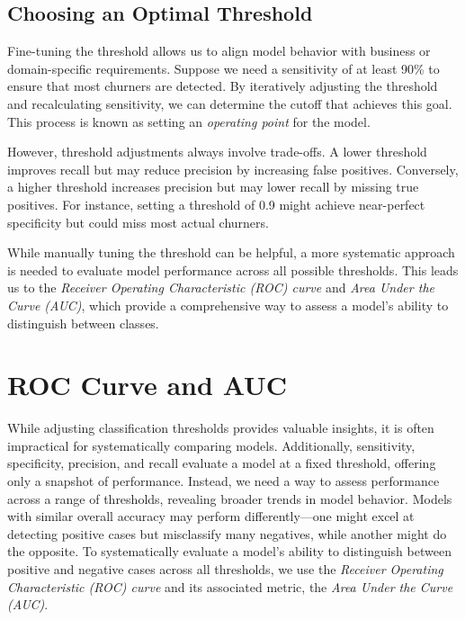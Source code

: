 \documentclass[
  11pt,
]{book}
\theoremstyle{definition}
\theoremstyle{definition}
\theoremstyle{definition}
\theoremstyle{definition}
\theoremstyle{remark}
\begin{document}
\subsection*{Choosing an Optimal Threshold}\label{choosing-an-optimal-threshold}


Fine-tuning the threshold allows us to align model behavior with business or domain-specific requirements. Suppose we need a sensitivity of at least 90\% to ensure that most churners are detected. By iteratively adjusting the threshold and recalculating sensitivity, we can determine the cutoff that achieves this goal. This process is known as setting an \emph{operating point} for the model.

However, threshold adjustments always involve trade-offs. A lower threshold improves recall but may reduce precision by increasing false positives. Conversely, a higher threshold increases precision but may lower recall by missing true positives. For instance, setting a threshold of 0.9 might achieve near-perfect specificity but could miss most actual churners.

While manually tuning the threshold can be helpful, a more systematic approach is needed to evaluate model performance across all possible thresholds. This leads us to the \emph{Receiver Operating Characteristic (ROC) curve} and \emph{Area Under the Curve (AUC)}, which provide a comprehensive way to assess a model's ability to distinguish between classes.

\section{ROC Curve and AUC}\label{roc-curve-and-auc}

While adjusting classification thresholds provides valuable insights, it is often impractical for systematically comparing models. Additionally, sensitivity, specificity, precision, and recall evaluate a model at a fixed threshold, offering only a snapshot of performance. Instead, we need a way to assess performance across a range of thresholds, revealing broader trends in model behavior. Models with similar overall accuracy may perform differently---one might excel at detecting positive cases but misclassify many negatives, while another might do the opposite. To systematically evaluate a model's ability to distinguish between positive and negative cases across all thresholds, we use the \emph{Receiver Operating Characteristic (ROC) curve} and its associated metric, the \emph{Area Under the Curve (AUC)}.
\end{document}
